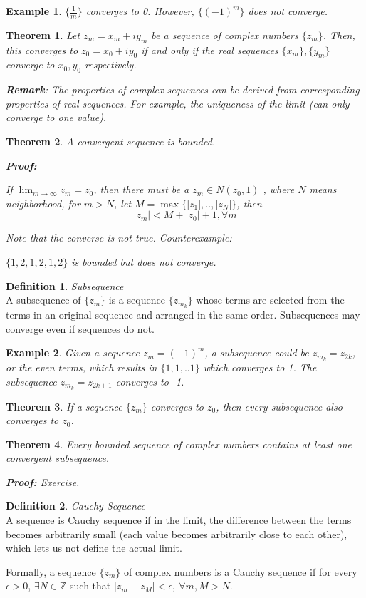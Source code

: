 \documentclass{article}
\newtheorem{theorem}{Theorem}[section]
\newtheorem{ex}{Example}
\theoremstyle{definition}
\newtheorem{definition}{Definition}[section]
\newcommand{\Def}[2]{
\begin{shaded*}
\begin{definition}{\textit{#1}}\\#2\end{definition}
\end{shaded*}
}
\begin{document}
\begin{ex}
$\{\frac{1}{m}\}$ converges to 0. However, $\{(-1)^{m}\}$ does not converge. 
\end{ex}

\begin{theorem}
Let $z_m = x_m + i y_m$ be a sequence of complex numbers $\{z_m\}$. Then, this converges to $z_0 = x_0 + i y_0$ if and only if the real sequences $\{x_m\}, \{y_m\}$ converge to $x_0, y_0$ respectively.

\textbf{Remark}: The properties of complex sequences can be derived from corresponding properties of real sequences. For example, the uniqueness of the limit (can only converge to one value).
\end{theorem}

\begin{theorem}
A convergent sequence is bounded. 

\textbf{Proof:}

If $\lim_{m\to\infty}z_m = z_0$, then there must be a $z_m \in N(z_0,1)$ , where $N$ means neighborhood, for $m>N$, let $M = \max\{|z_1|, .., |z_N|\}$, then
$$|z_m| < M + |z_0| + 1, \forall m$$

Note that the converse is not true. Counterexample:

$\{1,2,1,2,1,2\}$ is bounded but does not converge. 
\end{theorem}
\Def{Subsequence}{A subsequence of $\{z_m\}$ is a sequence $\{z_{m_k}\}$ whose terms are selected from the terms in an original sequence and arranged in the same order. Subsequences may converge even if sequences do not.}
\begin{ex}
Given a sequence $z_m = (-1)^{m}$, a subsequence could be $z_{m_k} = z_{2k}$, or the even terms, which results in $\{1,1,..1\}$ which converges to 1. The subsequence $z_{m_k} = z_{2k+1}$ converges to -1.
\end{ex}

\begin{theorem}
If a sequence $\{z_m\}$ converges to $z_0$, then every subsequence also converges to $z_0$. 
\end{theorem}

\begin{theorem}
Every bounded sequence of complex numbers contains at least one convergent subsequence. 

\textbf{Proof:} Exercise. 
\end{theorem}

\Def{Cauchy Sequence}{A sequence is Cauchy sequence if in the limit, the difference between the terms becomes arbitrarily small (each value becomes arbitrarily close to each other), which lets us not define the actual limit. 

Formally, a sequence $\{z_m\}$ of complex numbers is a Cauchy sequence if for every $\epsilon>0$, $\exists N \in \mathbb{Z}$ such that $|z_m - z_M| < \epsilon,\ \forall m, M>N$.}
\end{document}
